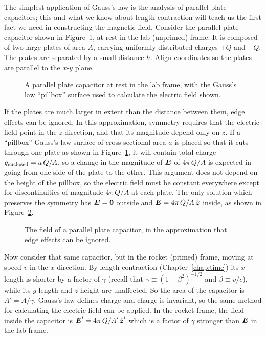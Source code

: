 The simplest application of Gauss's law is the analysis of parallel
plate capacitors; this and what we know about length contraction will
teach us the first fact we need in constructing the magnetic field.
Consider the parallel plate capacitor shown in
Figure~\ref{fig:capacitor1}, at rest in the lab (unprimed) frame.  It
is composed of two large plates of area $A$, carrying uniformly
distributed charges $+Q$ and $-Q$.  The plates are separated by a
small distance $h$.  Align coordinates so the plates are parallel to
the $x$-$y$ plane.
\begin{figure}
\vspace{2in}
\caption[A parallel plate capacitor at rest]{A parallel plate
capacitor at rest in the lab frame, with the Gauss's law ``pillbox''
surface used to calculate the electric field shown.}
\label{fig:capacitor1}
\end{figure}
If the plates are much larger in extent than the distance between
them, edge effects can be ignored.  In this approximation, symmetry
requires that the electric field point in the $z$ direction, and that
its magnitude depend only on $z$.  If a ``pillbox'' Gauss's law
surface of cross-sectional area $a$ is placed so that it cuts through
one plate as shown in Figure~\ref{fig:capacitor1}, it will contain
total charge $q_{\rm enclosed}=a\,Q/A$, so a change in the magnitude
of $\mbox{\boldmath $E$}$ of $4\pi\,Q/A$ is expected in going from one side of the
plate to the other.  This argument does not depend on the height of
the pillbox, so the electric field must be constant everywhere except
for discontinuities of magnitude $4\pi\,Q/A$ at each plate.  The only
solution which preserves the symmetry has $\mbox{\boldmath $E$}=\mbox{\boldmath $0$}$ outside and
$\mbox{\boldmath $E$}=4\pi\,Q/A\,\hat{\mbox{\boldmath $z$}}$ inside, as shown in
Figure~\ref{fig:capacitor2}.
\begin{figure}
\vspace{2in}
\caption[The field of a parallel-plate capacitor]{The field of a
parallel plate capacitor, in the approximation that edge effects can
be ignored.}
\label{fig:capacitor2}
\end{figure}

Now consider that same capacitor, but in the rocket (primed) frame,
moving at speed $v$ in the $x$-direction.  By length contraction
(Chapter~\ref{chap:time}) its $x$-length is shorter by a
factor of $\gamma$ (recall that $\gamma\equiv (1-\beta^2)^{-1/2}$ and
$\beta\equiv v/c$), while its $y$-length and $z$-height are
unaffected.  So the area of the capacitor is $A'=A/\gamma$.  Gauss's
law defines charge and charge is invariant, so the same method for
calculating the electric field can be applied.  In the rocket frame,
the field inside the capacitor is $\mbox{\boldmath $E$}'=4\pi\,Q/A'\,\hat{\mbox{\boldmath $z$}}'$
which is a factor of $\gamma$ stronger than $\mbox{\boldmath $E$}$ in the lab frame.

